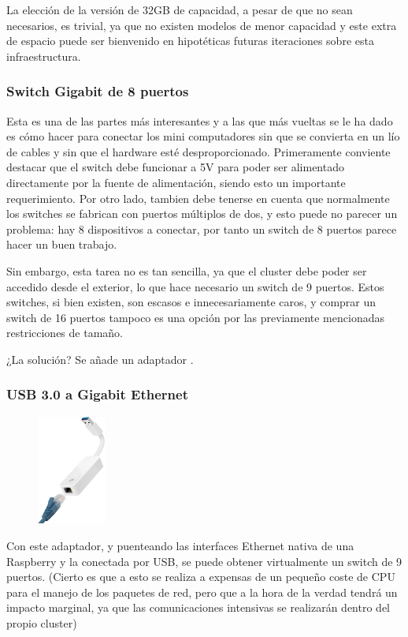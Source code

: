 La elección de la versión de 32GB de capacidad, a pesar de que no sean necesarios, es trivial, ya que no existen modelos de menor capacidad y este extra de espacio puede ser bienvenido en hipotéticas futuras iteraciones sobre esta infraestructura.


\subsubsection{Switch Gigabit de 8 puertos}
Esta es una de las partes más interesantes y a las que más vueltas se le ha dado es cómo hacer para conectar los mini computadores sin que se convierta en un lío de cables y sin que el hardware esté desproporcionado. Primeramente conviente destacar que el switch debe funcionar a 5V para poder ser alimentado directamente por la fuente de alimentación, siendo esto un importante requerimiento.
Por otro lado, tambien debe tenerse en cuenta que normalmente los switches se fabrican con puertos múltiplos de dos, y esto puede no parecer un problema: hay 8 dispositivos a conectar, por tanto un switch de 8 puertos parece hacer un buen trabajo.


Sin embargo, esta tarea no es tan sencilla, ya que el cluster debe poder ser accedido desde el exterior, lo que hace necesario un switch de 9 puertos. Estos switches, si bien existen, son escasos e innecesariamente caros, y comprar un switch de 16 puertos tampoco es una opción por las previamente mencionadas restricciones de tamaño.

¿La solución? Se añade un adaptador .

\subsubsection{USB 3.0 a Gigabit Ethernet}
\label{sssec:usb30age}
\begin{figure}
  \vspace*{-1.4cm}
  \centering
  \includegraphics[width=0.20\textwidth]{img/tplink-usb-eth.jpg}
  \label{fig:tplink-usb-eth}
\end{figure}
Con este adaptador, y puenteando las interfaces Ethernet nativa de una Raspberry y la conectada por USB, se puede obtener virtualmente un switch de 9 puertos. (Cierto es que a esto se realiza a expensas de un pequeño coste de CPU para el manejo de los paquetes de red, pero que a la hora de la verdad tendrá un impacto marginal, ya que las comunicaciones intensivas se realizarán dentro del propio cluster)

